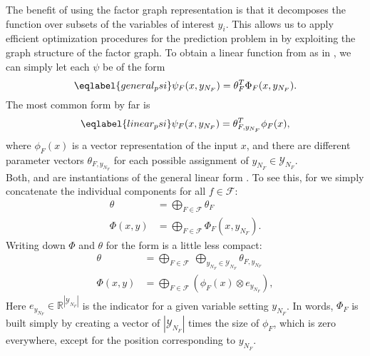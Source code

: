 The benefit of using the factor graph representation is that it decomposes the
function over subsets of the variables of interest $y_i$. This allows us to apply
efficient optimization procedures for the prediction problem in
 by exploiting the graph structure of the factor graph.
%
To obtain a linear function from
 as in , we can simply let each $\psi$ be of the form
\begin{equation}\eqlabel{general_psi}
    \psi_F(x, y_{N_F}) = \theta_F^T \Phi_F(x, y_{N_F}).
\end{equation}
The most common form by far is 
\begin{equation}\eqlabel{linear_psi}
    \psi_F(x, y_{N_F}) = \theta_{F, y_{N_F}}^T \phi_F(x),
\end{equation}
where $\phi_F(x)$ is a vector representation of the input $x$, and there are
different parameter vectors $\theta_{F, y_{N_F}}$ for each possible assignment
of $y_{N_F} \in \mathcal{Y}_{N_F}$.\pagebreak\\
%
Both,  and  are instantiations of the general
linear form . To see this, for  we simply
concatenate the individual components for all $f \in \mathcal{F}$:
\begin{align}
    \theta &= \bigoplus_{F \in \mathcal{F}} \theta_F\\
    \Phi(x, y) &= \bigoplus_{F \in \mathcal{F}} \Phi_F(x, y_{N_F}).
\end{align}
Writing down $\Phi$ and $\theta$ for the form  is a little less compact:
\begin{align}
    \theta &= \bigoplus_{F \in \mathcal{F}}\ \bigoplus_{y_{N_F} \in \mathcal{Y}_{N_F}} \theta_{F, y_{N_F}}\\
    \Phi(x, y) &= \bigoplus_{F \in \mathcal{F}} \left (\phi_F(x) \otimes e_{y_{N_F}} \right ),
\end{align}
Here $e_{y_{N_F}} \in \mathbb{R}^{|\mathcal{Y}_{N_F}|}$ is the indicator for a
given variable setting $y_{N_F}$.
In words, $\Phi_F$ is built simply by creating a vector of
$|\mathcal{Y}_{N_F}|$ times the size of $\phi_F$, which is zero everywhere,
except for the position corresponding to $y_{N_F}$. %

